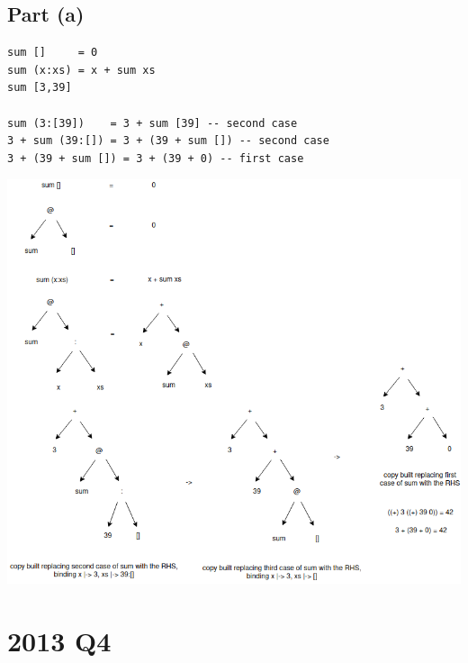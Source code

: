 \documentclass[11pt]{article}
\begin{document}
\subsection{Part (a)}
\label{sec:orgf8619b4}
\begin{verbatim}
sum []     = 0
sum (x:xs) = x + sum xs
sum [3,39]

sum (3:[39])    = 3 + sum [39] -- second case
3 + sum (39:[]) = 3 + (39 + sum []) -- second case
3 + (39 + sum []) = 3 + (39 + 0) -- first case
\end{verbatim}
\begin{center}
\includegraphics[width=160mm]{./sum-xs.png}
\end{center}
\newpage
\section{2013 Q4}
\label{sec:org7847725}
\end{document}
